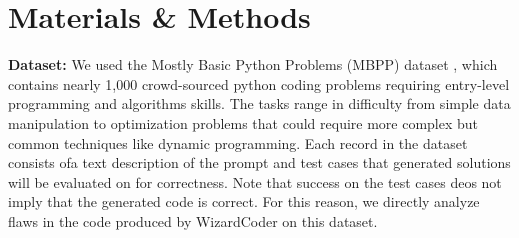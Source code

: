 \documentclass[10pt]{article}
\theoremstyle{definition}
\begin{document}

\section{Materials \& Methods}
\noindent\textbf{Dataset:} We used the Mostly Basic Python Problems (MBPP) dataset \cite{mbpp}, which contains nearly 1,000 crowd-sourced python coding problems requiring entry-level programming and algorithms skills. The tasks range in difficulty from simple data manipulation to optimization problems that could require more complex but common techniques like dynamic programming. Each record in the dataset consists ofa text description of the prompt and test cases that generated solutions will be evaluated on for correctness. Note that success on the test cases deos not imply that the generated code is correct. For this reason, we directly analyze flaws in the code produced by WizardCoder on this dataset.\\
\end{document}
